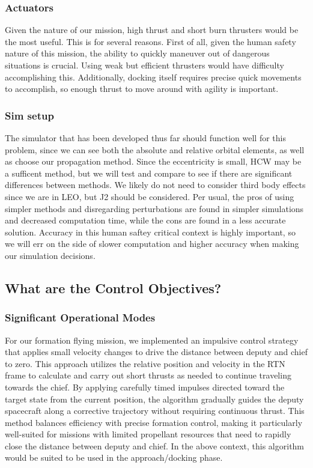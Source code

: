 \subsubsection{Actuators}
Given the nature of our mission, high thrust and short burn thrusters would be the most useful. This is for several reasons. First of all, given the human safety nature of this mission, the ability to quickly maneuver out of dangerous situations is crucial. Using weak but efficient thrusters would have difficulty accomplishing this. Additionally, docking itself requires precise quick movements to accomplish, so enough thrust to move around with agility is important.

\subsubsection{Sim setup}
The simulator that has been developed thus far should function well for this problem, since we can see both the absolute and relative orbital elements, as well as choose our propagation method. Since the eccentricity is small, HCW may be a sufficent method, but we will test and compare to see if there are significant differences between methods. We likely do not need to consider third body effects since we are in LEO, but J2 should be considered. Per usual, the pros of using simpler methods and disregarding perturbations are found in simpler simulations and decreased computation time, while the cons are found in a less accurate solution. Accuracy in this human saftey critical context is highly important, so we will err on the side of slower computation and higher accuracy when making our simulation decisions. 

\subsection{What are the Control Objectives?}

\subsubsection{Significant Operational Modes}
For our formation flying mission, we implemented an impulsive control strategy that applies small velocity changes to drive the distance between deputy and chief to zero. This approach utilizes the relative position and velocity in the RTN frame to calculate and carry out short thrusts as needed to continue traveling towards the chief. By applying carefully timed impulses directed toward the target state from the current position, the algorithm gradually guides the deputy spacecraft along a corrective trajectory without requiring continuous thrust. This method balances efficiency with precise formation control, making it particularly well-suited for missions with limited propellant resources that need to rapidly close the distance between deputy and chief. In the above context, this algorithm would be suited to be used in the approach/docking phase.

